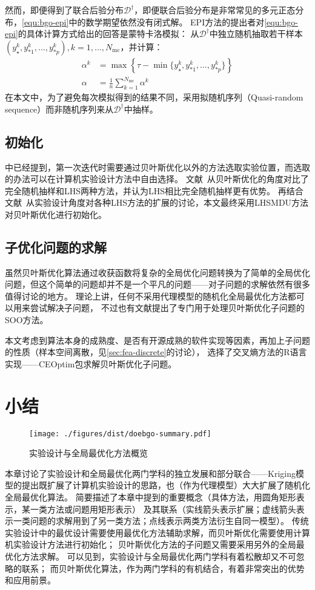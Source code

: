 \documentclass[index]{subfiles}
\begin{document}
然而，即便得到了联合后验分布$\mathcal{D}^\dag$，即便联合后验分布是非常常见的多元正态分布，\cref{equ:bgo-epi}中的数学期望依然没有闭式解。
EPI方法的提出者对\cref{equ:bgo-epi}的具体计算方式给出的回答是蒙特卡洛模拟\cite{clark2012}：
从$\mathcal{D}^\dag$中独立随机抽取若干样本$\left(y_\star^k, y_{\ast 1}^k,\ldots,y_{\ast p}^k\right), k=1,\ldots,N_\mathrm{mc}$，并计算：
\begin{align}\label{equ:bgo-mc}
  \alpha^k &= \max\!\left\{\tau - \min\{y_\star^k, y_{\ast 1}^k,\ldots,y_{\ast p}^k\}\right\} \\
  \alpha &= \frac{1}{n}\sum_{k=1}^{N_\mathrm{mc}}\alpha^k
\end{align}
在本文中，为了避免每次模拟得到的结果不同，采用拟随机序列（Quasi-random sequence）而非随机序列来从$\mathcal{D}^\dag$中抽样。

\subsection{初始化}\label{ssec:bgo-init}
中已经提到，第一次迭代时需要通过贝叶斯优化以外的方法选取实验位置，而选取的办法可以在计算机实验设计方法中自由选择。
文献~从贝叶斯优化的角度对比了完全随机抽样和LHS两种方法，并认为LHS相比完全随机抽样更有优势。
再结合文献~从实验设计角度对各种LHS方法的扩展的讨论，本文最终采用LHSMDU方法对贝叶斯优化进行初始化。

\subsection{子优化问题的求解}\label{ssec:bgo-sub}
虽然贝叶斯优化算法通过收获函数将复杂的全局优化问题转换为了简单的全局优化问题，但这个简单的问题却并不是一个平凡的问题——对子问题的求解依然有很多值得讨论的地方。
理论上讲，任何不采用代理模型的随机化全局最优化方法都可以用来尝试解决子问题，
不过也有文献提出了专门用于处理贝叶斯优化子问题的SOO方法\cite{munos2011}。

本文考虑到算法本身的成熟度、是否有开源成熟的软件实现等因素，再加上子问题的性质（样本空间离散，见\cref{sec:fea-discrete}的讨论），
选择了交叉熵方法的R语言实现——CEOptim包\cite{benham2015}求解贝叶斯优化子问题。

\section{小结}
\begin{figure}[h]
  \centering
  \texttt{[image: ./figures/dist/doebgo-summary.pdf]}
  \caption{实验设计与全局最优化方法概览\label{fig:doebgo-summary}}
\end{figure}
本章讨论了实验设计和全局最优化两门学科的独立发展和部分联合——Kriging模型的提出既扩展了计算机实验设计的思路，也（作为代理模型）大大扩展了随机化全局最优化算法。
简要描述了本章中提到的重要概念（具体方法，用圆角矩形表示，某一类方法或问题用矩形表示）
及其联系（实线箭头表示扩展；虚线箭头表示一类问题的求解用到了另一类方法；点线表示两类方法衍生自同一模型）。
传统实验设计中的最优设计需要使用最优化方法辅助求解，而贝叶斯优化需要使用计算机实验设计方法进行初始化；
贝叶斯优化方法的子问题又需要采用另外的全局最优化方法求解。
可以见到，实验设计与全局最优化两门学科有着松散却又不可忽略的联系；
而贝叶斯优化算法，作为两门学科的有机结合，有着非常突出的优势和应用前景。
\end{document}
